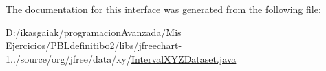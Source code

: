 The documentation for this interface was generated from the following file\+:\begin{DoxyCompactItemize}
\item 
D\+:/ikasgaiak/programacion\+Avanzada/\+Mis Ejercicios/\+P\+B\+Ldefinitibo2/libs/jfreechart-\/1../source/org/jfree/data/xy/\mbox{\hyperlink{_interval_x_y_z_dataset_8java}{Interval\+X\+Y\+Z\+Dataset.\+java}}\end{DoxyCompactItemize}
